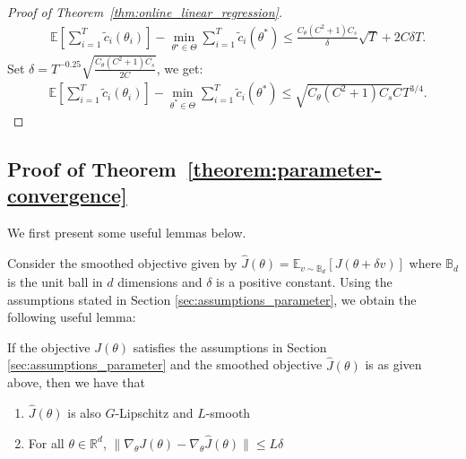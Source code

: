 \begin{proof}[Proof of Theorem~\ref{thm:online_linear_regression}]
\begin{align*}
    &\mathbb{E}\left[\sum_{i=1}^T \tilde{c}_i(\theta_i)\right] - \min_{\theta^\star\in{\Theta}}\sum_{i=1}^T \tilde{c}_i(\theta^*)\leq \frac{C_{\theta}(C^2+1)C_{s}}{\delta}\sqrt{T} + 2C\delta T.
\end{align*}
Set $\delta = T^{-0.25}\sqrt{\frac{C_{\theta}(C^2+1)C_{s}}{2C}}$, we get:
\begin{align*}
  &\mathbb{E}\left[\sum_{i=1}^T \tilde{c}_i(\theta_i)\right] - \min_{\theta^*\in{\Theta}}\sum_{i=1}^T \tilde{c}_i(\theta^*)\leq \sqrt{C_{\theta}(C^2+1)C_{s}C}T^{3/4}.
\end{align*}
\end{proof}




\subsection{Proof of Theorem~\ref{theorem:parameter-convergence}}
\label{sec:proofs_RL}

We first present some useful lemmas below.


Consider the smoothed objective given by $\hat{J}(\theta) =
\mathbb{E}_{v \sim \mathbb{B}_d}[J(\theta + \delta v)]$ where
$\mathbb{B}_d$ is the unit ball in $d$ dimensions and $\delta$ is a
positive constant. Using the assumptions stated in Section
\ref{sec:assumptions_parameter}, we obtain the following useful lemma:
\begin{lemma}
  \label{lemma:grad-diff-parameter}
  If the objective $J(\theta)$ satisfies the assumptions in Section
  \ref{sec:assumptions_parameter} and the smoothed objective
  $\hat{J}(\theta)$
  is as given above,
  then we have that
  \begin{enumerate}
  \item $\hat{J}(\theta)$ is also $G$-Lipschitz and $L$-smooth
  \item For all $\theta \in \mathbb{R}^d$, $\|\nabla_\theta J(\theta)
    - \nabla_\theta \hat{J}(\theta)\| \leq L\delta$
  \end{enumerate}
\end{lemma}



